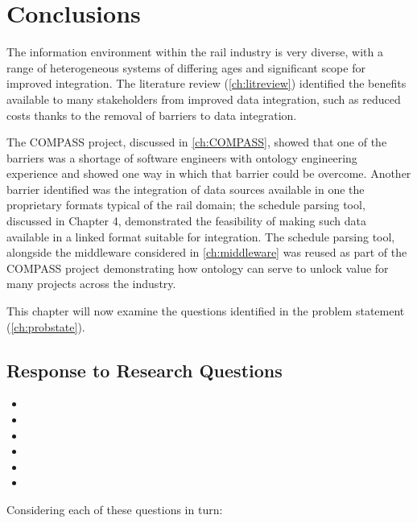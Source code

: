 \chapter{Conclusions}\label{ch:Conclusions}
The information environment within the rail industry is very diverse, with a range of heterogeneous systems of differing ages and significant scope for improved integration. The literature review (\autoref{ch:litreview}) identified the benefits available to many stakeholders from improved data integration, such as reduced costs thanks to the removal of barriers to data integration. 

The COMPASS project, discussed in \autoref{ch:COMPASS}, showed that one of the barriers was a shortage of software engineers with ontology engineering experience and showed one way in which that barrier could be overcome. Another barrier identified was the integration of data sources available in one the proprietary formats typical of the rail domain; the schedule parsing tool, discussed in Chapter 4, demonstrated the feasibility of making such data available in a linked format suitable for integration. The schedule parsing tool, alongside the middleware considered in \autoref{ch:middleware} was reused as part of the COMPASS project demonstrating how ontology can serve to unlock value for many projects across the industry.

This chapter will now examine the questions identified in the problem statement (\autoref{ch:probstate}).

\section{Response to Research Questions}

\begin{itemize}
	\item \QuestionOtherData
	\item \QuestionSkillz 	
	\item \QuestionCombine
	\item \QuestionChange
	\item \QuestionCanOntologyScale
	\item \QuestionSecurity		
\end{itemize}

Considering each of these questions in turn:

